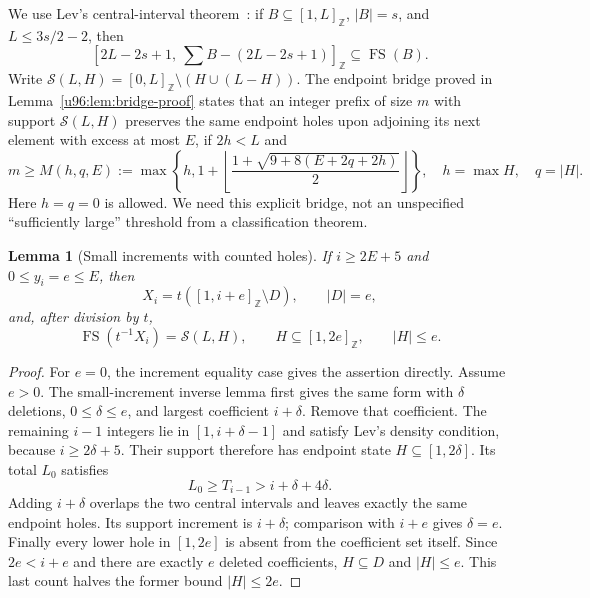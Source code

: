 \documentclass[11pt,a4paper]{article}
\newtheorem{lemma}[theorem]{Lemma}
\theoremstyle{remark}
\newcommand{\FS}{\operatorname{FS}}
\begin{document}
We use Lev's central-interval theorem~\cite{Lev1998}: if
$B\subseteq[1,L]_{\mathbb Z}$, $|B|=s$, and $L\leq3s/2-2$, then
\[
[2L-2s+1,\ \sum B-(2L-2s+1)]_{\mathbb Z}\subseteq\FS(B).
\]
Write $\mathcal S(L,H)=[0,L]_{\mathbb Z}\setminus(H\cup(L-H))$.
The endpoint bridge proved in Lemma~\ref{u96:lem:bridge-proof} states that an
integer prefix of size $m$ with support $\mathcal S(L,H)$ preserves the same
endpoint holes upon adjoining its next element with excess at most $E$, if
$2h<L$ and
\[
m\geq M(h,q,E):=
\max\left\{h,1+\left\lfloor
\frac{1+\sqrt{9+8(E+2q+2h)}}2\right\rfloor\right\},
\quad h=\max H,\quad q=|H|.
\]
Here $h=q=0$ is allowed. We need this explicit bridge, not an unspecified
``sufficiently large'' threshold from a classification theorem.

\begin{lemma}[Small increments with counted holes]\label{u96:lem:counted-holes}
If $i\geq2E+5$ and $0\leq y_i=e\leq E$, then
\[
X_i=t([1,i+e]_{\mathbb Z}\setminus D),\qquad |D|=e,
\]
and, after division by $t$,
\[
\FS(t^{-1}X_i)=\mathcal S(L,H),\qquad
H\subseteq[1,2e]_{\mathbb Z},\qquad |H|\leq e.
\]
\end{lemma}
\begin{proof}
For $e=0$, the increment equality case gives the assertion directly.
Assume $e>0$. The small-increment inverse lemma first gives the same form with $\delta$
deletions, $0\leq\delta\leq e$, and largest coefficient $i+\delta$.
Remove that coefficient. The remaining $i-1$ integers lie in
$[1,i+\delta-1]$ and satisfy Lev's density condition, because
$i\geq2\delta+5$. Their support therefore has endpoint state
$H\subseteq[1,2\delta]$. Its total $L_0$ satisfies
\[
L_0\geq T_{i-1}>i+\delta+4\delta.
\]
Adding $i+\delta$ overlaps the two central intervals and leaves exactly
the same endpoint holes. Its support increment is $i+\delta$; comparison
with $i+e$ gives $\delta=e$.
Finally every lower hole in $[1,2e]$ is absent from the coefficient set
itself. Since $2e<i+e$ and there are exactly $e$ deleted coefficients,
$H\subseteq D$ and $|H|\leq e$. This last count halves the former bound
$|H|\leq2e$.
\end{proof}
\end{document}
